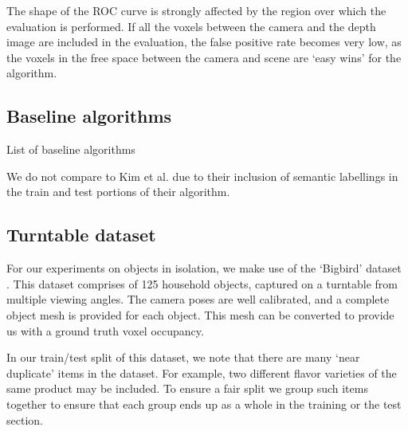 \documentclass[10pt,twocolumn,letterpaper]{article}
\makeatletter
\newcommand*{\ea}{et al.\@\xspace}
\makeatother
\begin{document}
The shape of the ROC curve is strongly affected by the region over which the evaluation is performed.
If all the voxels between the camera and the depth image are included in the evaluation, the false positive rate becomes very low, as the voxels in the free space between the camera and scene are `easy wins' for the algorithm. 


\subsection{Baseline algorithms}

List of baseline algorithms

We do not compare to Kim \ea \cite{kim-iccv-2013} due to their inclusion of semantic labellings in the train and test portions of their algorithm.


\subsection{Turntable dataset}

For our experiments on objects in isolation, we make use of the `Bigbird' dataset \cite{singh-icra-2014}. 
This dataset comprises of 125 household objects, captured on a turntable from multiple viewing angles.
The camera poses are well calibrated, and a complete object mesh is provided for each object.
This mesh can be converted to provide us with a ground truth voxel occupancy.

In our train/test split of this dataset, we note that there are many `near duplicate' items in the dataset.
For example, two different flavor varieties of the same product may be included.
To ensure a fair split we group such items together to ensure that each group ends up as a whole in the training or the test section.
\end{document}
